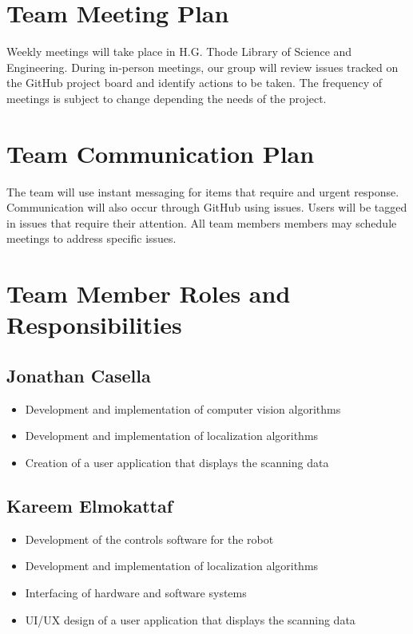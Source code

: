 \documentclass[titlepage]{article}
\begin{document}
\section{Team Meeting Plan}

Weekly meetings will take place in H.G. Thode Library of Science and Engineering. During in-person meetings, our group will review issues tracked on the GitHub project board and identify actions to be taken. The frequency of meetings is subject to change depending the needs of the project. 

\section{Team Communication Plan}

The team will use instant messaging for items that require and urgent response. Communication will also occur through GitHub using issues. Users will be tagged in issues that require their attention. All team members members may schedule  meetings to address specific issues. 

\section{Team Member Roles and Responsibilities}

\subsection{Jonathan Casella}
\begin{itemize}
\item Development and implementation of computer vision algorithms
\item Development and implementation of localization algorithms
\item Creation of a user application that displays the scanning data
\end{itemize}

\subsection{Kareem Elmokattaf}
\begin{itemize}
\item Development of the controls software for the robot
\item Development and implementation of localization algorithms
\item Interfacing of hardware and software systems
\item UI/UX design of a user application that displays the scanning data
\end{itemize}
\end{document}

